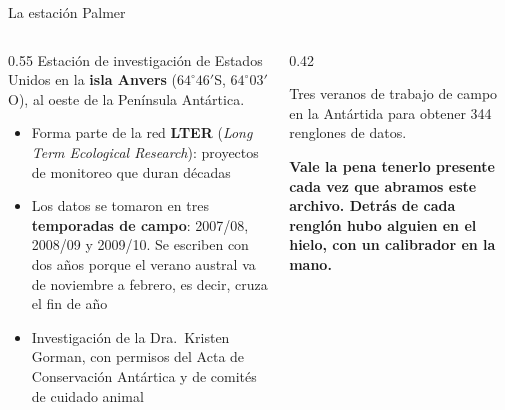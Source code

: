 \documentclass[aspectratio=169,10pt]{beamer}
\newcommand{\destaca}[1]{%
  \par\vspace{3pt}\noindent
  \colorbox{azulClaro}{%
    \parbox{\dimexpr\linewidth-2\fboxsep\relax}{\vspace{3pt}#1\vspace{3pt}}}%
  \par\vspace{3pt}}
\begin{document}
\begin{frame}{La estación Palmer}
  \begin{columns}[T]
    \begin{column}{0.55\textwidth}
      Estación de investigación de Estados Unidos en la \textbf{isla Anvers}
      ($64^\circ 46'$S, $64^\circ 03'$O), al oeste de la Península Antártica.
      \vspace{0.3cm}
      \begin{itemize}
        \item Forma parte de la red \textbf{LTER} (\textit{Long Term Ecological Research}):
          proyectos de monitoreo que duran décadas
        \item Los datos se tomaron en tres \textbf{temporadas de campo}: 2007/08, 2008/09 y 2009/10.
          Se escriben con dos años porque el verano austral va de noviembre a febrero, es decir,
          cruza el fin de año
        \item Investigación de la Dra.~Kristen Gorman, con permisos del Acta de Conservación
          Antártica y de comités de cuidado animal
      \end{itemize}
    \end{column}
    \begin{column}{0.42\textwidth}
      \destaca{\small Tres veranos de trabajo de campo en la Antártida para obtener
      344 renglones de datos.

      \vspace{0.25cm}
      \textbf{Vale la pena tenerlo presente cada vez que abramos este archivo. Detrás de cada
      renglón hubo alguien en el hielo, con un calibrador en la mano.}}
    \end{column}
  \end{columns}
\end{frame}
\end{document}
